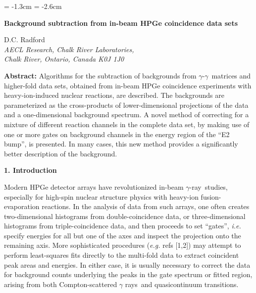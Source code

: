  \setlength{\textwidth}{16.5cm}
 \setlength{\textheight}{24cm}
 \hoffset = -1.3cm
 \voffset = -2.6cm
 \setlength{\parskip}{0.05in}
 \setlength{\parindent}{1cm}
 \setlength{\unitlength}{1mm}
 \pagestyle{myheadings}
 \markright{}

\newcommand{\gray}{$\gamma$ ray}
\newcommand{\grays}{$\gamma$ rays}
\newcommand{\ghray}{$\gamma$-ray}
\newcommand{\ghg}{$\gamma$-$\gamma$}
\newcommand{\ghghg}{$\gamma$-$\gamma$-$\gamma$}



\begin{center}
\large
{\bf       Background subtraction from in-beam HPGe coincidence data sets}
\normalsize
\end{center}
\vspace{5mm}
\begin{center}
                                D.C. Radford\\
{\em                AECL Research, Chalk River Laboratories,\\
                     Chalk River, Ontario, Canada K0J 1J0\\}
\end{center}
\vspace{8mm}
\setlength{\baselineskip}{4mm}
\begin{minipage}[t]{16.5cm}
{\bf Abstract: }
Algorithms for the subtraction of backgrounds from \ghg\ matrices and
higher-fold data sets, obtained from in-beam HPGe coincidence experiments with
heavy-ion-induced nuclear reactions, are described. The backgrounds are
parameterized as the cross-products of lower-dimensional projections of the
data and a one-dimensional background spectrum. A novel method of correcting
for a mixture of different reaction channels in the complete data set, by
making use of one or more gates on background channels in the energy region of
the ``E2 bump'', is presented. In many cases, this new method provides a
significantly better description of the background.

\end{minipage}

\newpage
\setlength{\baselineskip}{6mm}
\begin{center}
{\bf                                1. Introduction}
\end{center}

Modern HPGe detector arrays have revolutionized in-beam \ghray\ studies,
especially for high-spin nuclear structure physics with heavy-ion
fusion-evaporation reactions. In the analysis of data from such arrays, one
often creates two-dimensional histograms from double-coincidence data, or
three-dimensional histograms from triple-coincidence data, and then proceeds to
set ``gates'', {\em i.e.} specify energies for all but one of the axes and
inspect the projection onto the remaining axis. More sophisticated procedures
({\em e.g.} refs [1,2]) may attempt to perform least-squares fits directly to
the multi-fold data to extract coincident peak areas and energies. In either
case, it is usually necessary to correct the data for background counts
underlying the peaks in the gate spectrum or fitted region, arising from both
Compton-scattered \grays\ and quasicontinuum transitions.

